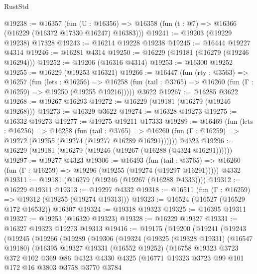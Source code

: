 \begin{lexlean}{RustStd}
\begin{coremodule}
@19238 := @16357
    (fun (U : @16356) => @16358 (fun (t : @7) => @16366 (@16229 (@16372 @17330 @16247) @16383)))
@19241 := @19203 (@19229 @19238) @17328
@19243 := @16214 @19228 @19238
@19245 := @16444 @19227 @4314
@19246 := @16281 @4314
@19250 := @16229 (@19181 (@16279 (@19246 @16294)))
@19252 := @19206 (@16316 @4314)
@19253 := @16300 @19252
@19255 := @16229 (@19253 @16321)
@19266 := @16447
    (fun (rty : @3563) =>
    @16257
      (fun (lets : @16256) =>
      @16258 (fun (tail : @3765) => @16260 (fun (Γ : @16259) => @19250 (@19255 @19216)))))
    @3622
@19267 := @16285 @3622
@19268 := @19267 @16293
@19272 := @16229 (@19181 (@16279 (@19246 @19268)))
@19273 := @16329 @3622
@19274 := @16328 @19273
@19275 := @16332 @19273
@19277 := @19275 @19211 @17333
@19289 := @16469
    (fun (lets : @16256) =>
    @16258
      (fun (tail : @3765) =>
      @16260 (fun (Γ : @16259) => @19272 (@19255 (@19274 (@19277 @16289 @16291))))))
    @4323
@19296 := @16229 (@19181 (@16279 (@19246 (@19267 (@16288 (@4324 @16291))))))
@19297 := @19277 @4323
@19306 := @16493
    (fun (tail : @3765) => @16260 (fun (Γ : @16259) => @19296 (@19255 (@19274 (@19297 @16291)))))
    @4332
@19311 := @19181 (@16279 (@19246 (@19267 (@16288 @4333))))
@19312 := @16229 @19311
@19313 := @19297 @4332
@19318 := @16511 (fun (Γ : @16259) => @19312 (@19255 (@19274 @19313)))
@19323 := @16524 (@16527 (@16529 @172 @16532)) @16307
@19324 := @19318 @19323
@19325 := @16395 @19311
@19327 := @19253 (@16320 @19323)
@19328 := @16229 @19327
@19331 := @16327 @19323 @19273 @19313
@19416 := @19175
    (@19200
      (@19241
        (@19243
          (@19245
            (@19266
              (@19289
                (@19306
                  (@19324
                    (@19325
                      (@19328 @19331)
                      (@16547 @19180)
                      (@16395
                        @19327
                        @19331
                        (@16552 @19252)
                        (@16758
                          @19323
                          @3723
                          @372
                          @102
                          @369
                          @86
                          @4323
                          @4330
                          @4325
                          (@16771
                            @19323
                            @3723
                            @99
                            @101
                            @172
                            @16
                            @3803
                            @3758
                            @3770
                            @3784

\end{coremodule}
\end{lexlean}
